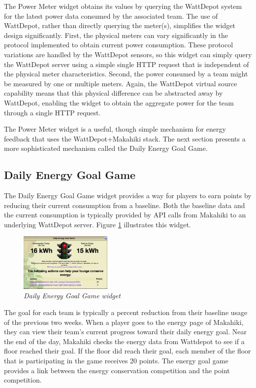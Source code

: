 The Power Meter widget obtains its values by querying the WattDepot system for the latest power data consumed by the associated team.  The use of WattDepot, rather than directly querying the meter(s), simplifies the widget design significantly.  First, the physical meters can vary significantly in the protocol implemented to obtain current power consumption.   These protocol variations are handled by the WattDepot sensors, so this widget can simply query the WattDepot server using a simple single HTTP request that is independent of the physical meter characteristics.  Second, the power consumed by a team might be measured by one or multiple meters.  Again, the WattDepot virtual source capability means that this physical difference can be abstracted away by WattDepot, enabling the widget to obtain the aggregate power for the team through a single HTTP request. 

The Power Meter widget is a useful, though simple mechanism for energy feedback that uses the WattDepot+Makahiki stack.   The next section presents a more sophisticated mechanism called the Daily Energy Goal Game.

\subsection{Daily Energy Goal Game}

The Daily Energy Goal Game widget provides a way for players to earn points by reducing their current consumption from a baseline. Both the baseline data and the current consumption is typically provided by API calls from Makahiki to an underlying WattDepot server.
Figure \ref{fig:DailyEnergyGoal} illustrates this widget.

\begin{figure}[th]
  \center
  \includegraphics[width=0.4\textwidth]{daily-energy-goal-game.eps}
  \caption{\em \small Daily Energy Goal Game widget}
  \label{fig:DailyEnergyGoal}
\end{figure}

The goal for each team is typically a percent reduction from their baseline usage of the previous two weeks. When a player goes to the energy page of Makahiki, they can view their team's current progress toward their daily energy goal. Near the end of the day, Makahiki checks the energy data from Wattdepot to see if a floor reached their goal. If the floor did reach their goal, each member of the floor that is participating in the game receives 20 points. The energy goal game provides a link between the energy conservation competition and the point competition.

